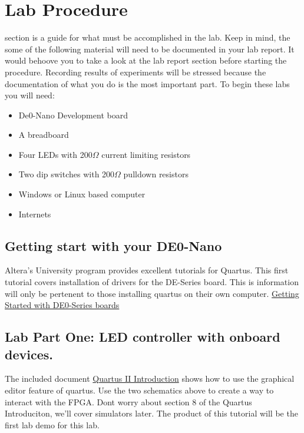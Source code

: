   \section{Lab Procedure}
     section is a guide for what must be accomplished in the lab. Keep in mind, the some of the following material will need to be documented in your lab report. It would behoove you to take a look at the lab report section before starting the procedure. Recording results of experiments will be stressed because the documentation of what you do is the most important part. To begin these labs you will need:
    \begin{itemize}
      \item De0-Nano Development board
      \item A breadboard
      \item Four LEDs with 200$\Omega$ current limiting resistors
      \item Two dip switches with 200$\Omega$ pulldown resistors
      \item Windows or Linux based computer
      \item Internets
    \end{itemize}
    
    \subsection{Getting start with your DE0-Nano}
      Altera's University program provides excellent tutorials for Quartus. This first tutorial covers installation of drivers for the DE-Series board. This is information will only be pertenent to those installing quartus on their own computer. \href{ftp://ftp.altera.com/up/pub/Altera_Material/13.0/Tutorials/Schematic/Quartus_II_Introduction.pdf}{Getting Started with DE0-Series boards} 

    \subsection{Lab Part One: LED controller with onboard devices.}
      The included document \href{ftp://ftp.altera.com/up/pub/Altera_Material/13.0/Tutorials/Schematic/Quartus_II_Introduction.pdf}{Quartus II Introduction} shows how to use the graphical editor feature of quartus. Use the two schematics above to create a way to interact with the FPGA. Dont worry about section 8 
      of the Quartus Introduciton, we'll cover simulators later. The product of this tutorial will be the first lab demo for this lab.

